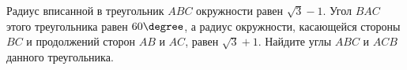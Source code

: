 \begin{ex}
	\begin{condition}
		Радиус вписанной в треугольник \( ABC  \) окружности равен \( \sqrt{3}-1 \). Угол \( BAC  \) этого треугольника равен \( 60\degree \), а радиус окружности, касающейся стороны \( BC  \) и продолжений сторон \( AB  \) и \( AC \), равен \( \sqrt{3}+1 \). Найдите углы \( ABC  \) и \( ACB  \) данного треугольника.
	\end{condition}
	\answer{\( 30\degree, 90\degree \)}
\end{ex}